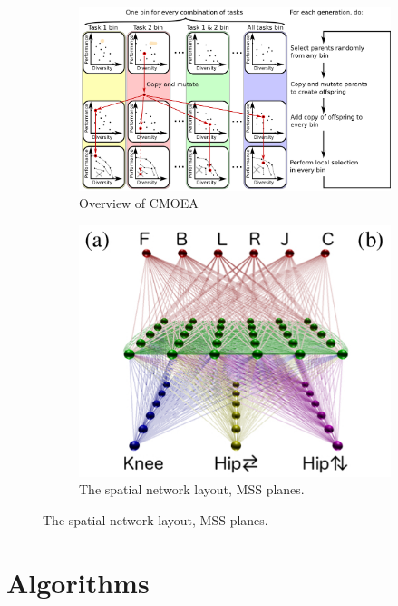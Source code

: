 \documentclass[format=acmsmall, review=false, screen=true]{acmart}
\begin{document}
\begin{figure}[H]
  \centering
  \begin{subfigure}[t]{0.55\textwidth}
    \includegraphics[width=\textwidth]{img/cmoea.JPEG}
    \caption{\label{fig:fronts}Overview of CMOEA}
  \end{subfigure}
  \hfill
  \begin{subfigure}[t]{0.43\textwidth}
    \includegraphics[width=\textwidth]{img/hyperneat.JPEG}
    \caption{\label{fig:endings}The spatial network layout, MSS planes.}
  \end{subfigure}
\end{figure}

\section{Algorithms}
\end{document}
